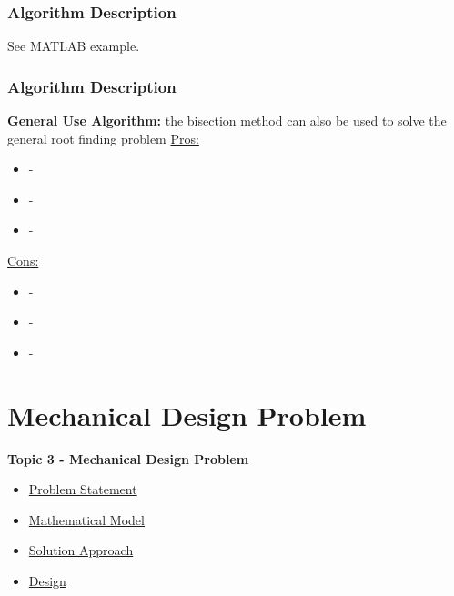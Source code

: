 \documentclass[fleqn]{beamer} %
\newcommand{\sectionIVtitle}{Mechanical Design Problem}
\newcommand{\sectionIIIsubsectionIIItitle}{Algorithm Description}
\newcommand{\sectionIVsubsectionItitle}{Problem Statement}
\newcommand{\sectionIVsubsectionIItitle}{Mathematical Model}
\newcommand{\sectionIVsubsectionIIItitle}{Solution Approach}
\newcommand{\sectionIVsubsectionIVtitle}{Design}
\begin{document}
			\begin{frame}
				\frametitle{\sectionIIIsubsectionIIItitle}
				\bigskip

				See MATLAB example.
 				
				\btVFill
			\end{frame}

			\begin{frame}
				\frametitle{\sectionIIIsubsectionIIItitle}
				\bigskip

				\textbf{General Use Algorithm:} the bisection method can also be used to solve the general root finding problem \vspcc
				\underline{Pros:}
				\begin{itemize}
			    	\item -
			    	\item -
			    	\item -
				\end{itemize} 

				\underline{Cons:}
				\begin{itemize}
					\item -
					\item -
					\item -
				\end{itemize}
				
				\btVFill
			\end{frame}



	\section{\sectionIVtitle}\label{sectionIV}

		\begin{frame}
			\large \textbf{Topic 3 - \sectionIVtitle} \vspace{3mm}\\

			\begin{itemize}
				\item \hyperlink{sectionIVsubsectionI}{\sectionIVsubsectionItitle} \vspc %
				\item \hyperlink{sectionIVsubsectionII}{\sectionIVsubsectionIItitle} \vspc %
				\item \hyperlink{sectionIVsubsectionIII}{\sectionIVsubsectionIIItitle} \vspc %
				\item \hyperlink{sectionIVsubsectionIV}{\sectionIVsubsectionIVtitle} \vspc %
			\end{itemize}

		\end{frame}
\end{document}
